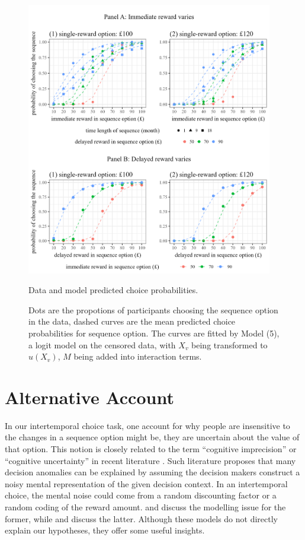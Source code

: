 \documentclass[
  12pt,
]{article}
\begin{document}
\begin{figure}
  \centering
  \includegraphics[width=0.96\textwidth]{figures/fig_grand_pred.png}
  \caption{Data and model predicted choice probabilities.}
  \caption*{\footnotesize Dots are the propotions of participants choosing the sequence option in the data, dashed curves are the mean predicted choice probabilities for sequence option. The curves are fitted by Model (5), a logit model on the censored data, with $X_v$ being transformed to $u(X_v)$, $M$ being added into interaction terms.}
  \label{fig:choice-predicted}
\end{figure}

\hypertarget{alternative-account}{%
\section{Alternative Account}\label{alternative-account}}

In our intertemporal choice task, one account for why people are
insensitive to the changes in a sequence option might be, they are
uncertain about the value of that option. This notion is closely related
to the term ``cognitive imprecision'' or ``cognitive uncertainty'' in
recent literature \citep{khaw2021cognitive, enke2023cognitive}. Such
literature proposes that many decision anomalies can be explained by
assuming the decision makers construct a noisy mental representation of
the given decision context. In an intertemporal choice, the mental noise
could come from a random discounting factor or a random coding of the
reward amount. \citet{gabaix2017myopia} and \citet{lu2018random} discuss
the modelling issue for the former, while \citet{heng2020efficient} and
\citet{khaw2021cognitive} discuss the latter. Although these models do
not directly explain our hypotheses, they offer some useful insights.
\end{document}
